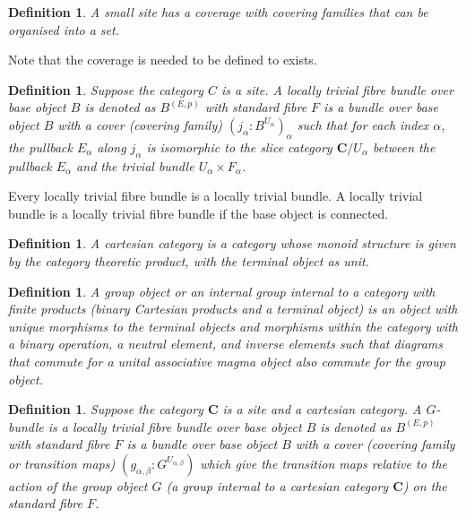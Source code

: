 \documentclass{tufte-book}
\newtheorem{definition}[theorem]{Definition}
\begin{document}
\begin{definition}
	A small site has a coverage with covering families that can be organised into a set.
\end{definition}

Note that the coverage is needed to be defined to exists.

\begin{definition}
	Suppose the category $C$ is a site.
	A locally trivial fibre bundle over base object $B$ is denoted as $B^{(E, p)}$ with standard fibre $F$ is a bundle over base object $B$ with a cover (covering family) $(j_\alpha : B^{U_\alpha})_\alpha$ such that for each index $\alpha$, the pullback $E_\alpha$ along $j_\alpha$ is isomorphic to the slice category $\mathbf{C} / U_\alpha$ between the pullback $E_\alpha$ and the trivial bundle $U_\alpha \times F_\alpha$.
\end{definition}

Every locally trivial fibre bundle is a locally trivial bundle. A locally trivial bundle is a locally trivial fibre bundle if the base object is connected.

\begin{definition}
	A cartesian category is a category whose monoid structure is given by the category theoretic product, with the terminal object as unit.
\end{definition}

\begin{definition}
	A group object or an internal group internal to a category with finite products (binary Cartesian products and a terminal object) is an object with unique morphisms to the terminal objects and morphisms within the category with a binary operation, a neutral element, and inverse elements such that diagrams that commute for a unital associative magma object also commute for the group object.
\end{definition}

\begin{definition}
	Suppose the category $\mathbf{C}$ is a site and a cartesian category.
	A $G$-bundle is a locally trivial fibre bundle over base object $B$ is denoted as $B^{(E, p)}$ with standard fibre $F$ is a bundle over base object $B$ with a cover (covering family or transition maps) $(g_{\alpha, \beta} : G^{U_{\alpha, \beta}})$ which give the transition maps relative to the action of the group object $G$ (a group internal to a cartesian category $\mathbf{C}$) on the standard fibre $F$.
\end{definition}
\end{document}
